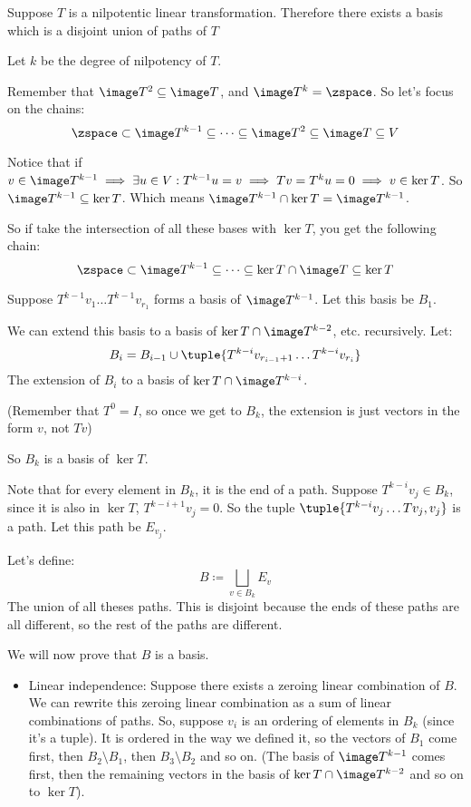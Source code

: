 \documentclass[10pt]{article}
\begin{document}
\begin{lemma}[pathBasisLemma]{Suppose $T$ is a nilpotentic linear transformation. Therefore there exists a basis which is a disjoint union of paths of $T$}

Let $k$ be the degree of nilpotency of $T$.

Remember that $\image T^2 \subseteq\image T$, and $\image T^k = \zspace$. So let's focus on the chains:
\[ \zspace\subset\image T^{k-1} \subseteq\dots\subseteq\image T^2\subseteq\image T\subseteq V \]

Notice that if $v\in\image T^{k-1}\implies\exists u\in V: T^{k-1}u=v\implies Tv=T^ku=0\implies v\in\ker T$. So $\image T^{k-1}\subseteq\ker T$. Which means $\image T^{k-1}\cap\ker T = \image T^{k-1}$.

So if take the intersection of all these bases with $\ker T$, you get the following chain:
\[ \zspace\subset\image T^{k-1}\subseteq\cdots\subseteq\ker T\cap\image T\subseteq\ker T \]

Suppose $T^{k-1}v_1\dots T^{k-1}v_{r_1}$ forms a basis of $\image T^{k-1}$. Let this basis be $B_1$.

We can extend this basis to a basis of $\ker T\cap\image T^{k-2}$, etc. recursively. Let:
\[ B_i = B_{i-1} \cup \tuple{T^{k-i}v_{r_{i-1}+1}\dots T^{k-i}v_{r_i}} \]
The extension of $B_i$ to a basis of $\ker T\cap\image T^{k-i}$.

(Remember that $T^0=I$, so once we get to $B_k$, the extension is just vectors in the form $v$, not $Tv$)

So $B_k$ is a basis of $\ker T$.

Note that for every element in $B_k$, it is the end of a path. Suppose $T^{k-i}v_j\in B_k$, since it is also in $\ker T$, $T^{k-i+1}v_j=0$. So the tuple $\tuple{T^{k-i}v_j\dots  Tv_j, v_j}$ is a path. Let this path be $E_{v_j}$.

Let's define:
\[ B\coloneqq\bigsqcup_{v\in B_k} E_v \]
The union of all theses paths. This is disjoint because the ends of these paths are all different, so the rest of the paths are different.

We will now prove that $B$ is a basis.

\begin{itemize}
    \item Linear independence: Suppose there exists a zeroing linear combination of $B$. We can rewrite this zeroing linear combination as a sum of linear combinations of paths. So, suppose $v_i$ is an ordering of elements in $B_k$ (since it's a tuple). It is ordered in the way we defined it, so the vectors of $B_1$ come first, then $B_2\setminus B_1$, then $B_3\setminus B_2$ and so on. (The basis of $\image T^{k-1}$ comes first, then the remaining vectors in the basis of $\ker T\cap\image T^{k-2}$ and so on to $\ker T$).
    

\end{itemize}
\end{lemma}
\end{document}
